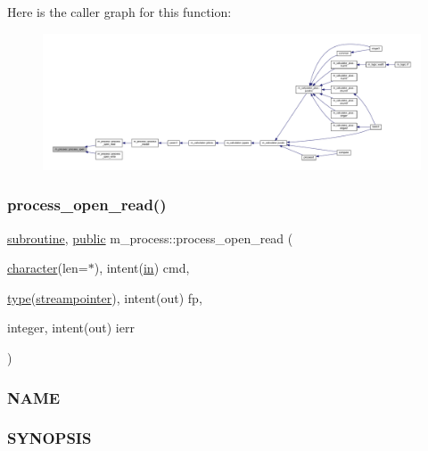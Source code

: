 Here is the caller graph for this function\+:
\nopagebreak
\begin{figure}[H]
\begin{center}
\leavevmode
\includegraphics[width=350pt]{namespacem__process_a3c0f543a9ceff2671041d73660f60a59_icgraph}
\end{center}
\end{figure}
\mbox{\label{namespacem__process_aaaf4d1926258a4cec7da7fc61c38c79d}} 
\subsubsection{\texorpdfstring{process\+\_\+open\+\_\+read()}{process\_open\_read()}}
{\footnotesize\ttfamily \hyperlink{M__stopwatch_83_8txt_acfbcff50169d691ff02d4a123ed70482}{subroutine}, \hyperlink{M__stopwatch_83_8txt_a2f74811300c361e53b430611a7d1769f}{public} m\+\_\+process\+::process\+\_\+open\+\_\+read (\begin{DoxyParamCaption}\item[{\hyperlink{option__stopwatch_83_8txt_abd4b21fbbd175834027b5224bfe97e66}{character}(len=$\ast$), intent(\hyperlink{M__journal_83_8txt_afce72651d1eed785a2132bee863b2f38}{in})}]{cmd,  }\item[{\hyperlink{stop__watch_83_8txt_a70f0ead91c32e25323c03265aa302c1c}{type}(\hyperlink{structm__process_1_1streampointer}{streampointer}), intent(out)}]{fp,  }\item[{integer, intent(out)}]{ierr }\end{DoxyParamCaption})}



\subsubsection*{N\+A\+ME}

\subsubsection*{S\+Y\+N\+O\+P\+S\+IS}

